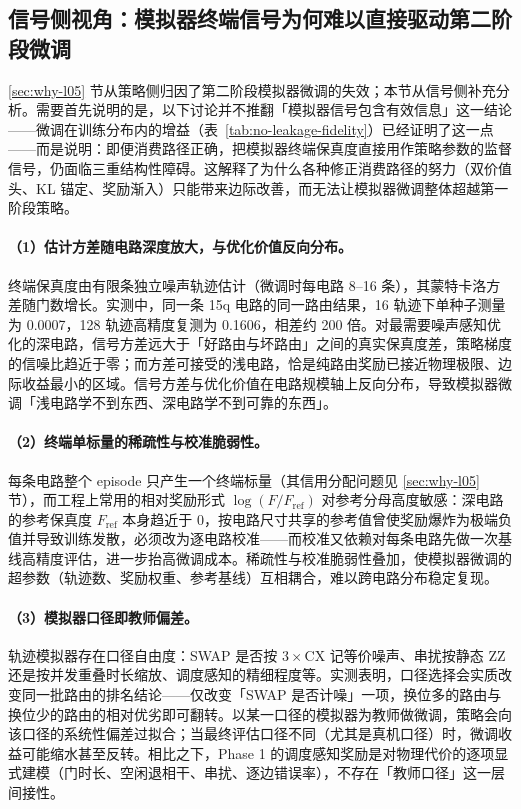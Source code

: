 \subsection{信号侧视角：模拟器终端信号为何难以直接驱动第二阶段微调}
\label{sec:sim-signal-limit}

\ref{sec:why-l05} 节从策略侧归因了第二阶段模拟器微调的失效；本节从信号侧补充分析。需要首先说明的是，以下讨论并不推翻「模拟器信号包含有效信息」这一结论——微调在训练分布内的增益（表~\ref{tab:no-leakage-fidelity}）已经证明了这一点——而是说明：即便消费路径正确，把模拟器终端保真度直接用作策略参数的监督信号，仍面临三重结构性障碍。这解释了为什么各种修正消费路径的努力（双价值头、KL 锚定、奖励渐入）只能带来边际改善，而无法让模拟器微调整体超越第一阶段策略。

\paragraph{（1）估计方差随电路深度放大，与优化价值反向分布。} 终端保真度由有限条独立噪声轨迹估计（微调时每电路 8--16 条），其蒙特卡洛方差随门数增长。实测中，同一条 15q 电路的同一路由结果，16 轨迹下单种子测量为 0.0007，128 轨迹高精度复测为 0.1606，相差约 200 倍。对最需要噪声感知优化的深电路，信号方差远大于「好路由与坏路由」之间的真实保真度差，策略梯度的信噪比趋近于零；而方差可接受的浅电路，恰是纯路由奖励已接近物理极限、边际收益最小的区域。信号方差与优化价值在电路规模轴上反向分布，导致模拟器微调「浅电路学不到东西、深电路学不到可靠的东西」。

\paragraph{（2）终端单标量的稀疏性与校准脆弱性。} 每条电路整个 episode 只产生一个终端标量（其信用分配问题见 \ref{sec:why-l05} 节），而工程上常用的相对奖励形式 $\log(F/F_{\mathrm{ref}})$ 对参考分母高度敏感：深电路的参考保真度 $F_{\mathrm{ref}}$ 本身趋近于 0，按电路尺寸共享的参考值曾使奖励爆炸为极端负值并导致训练发散，必须改为逐电路校准——而校准又依赖对每条电路先做一次基线高精度评估，进一步抬高微调成本。稀疏性与校准脆弱性叠加，使模拟器微调的超参数（轨迹数、奖励权重、参考基线）互相耦合，难以跨电路分布稳定复现。

\paragraph{（3）模拟器口径即教师偏差。} 轨迹模拟器存在口径自由度：SWAP 是否按 $3\times$CX 记等价噪声、串扰按静态 ZZ 还是按并发重叠时长缩放、调度感知的精细程度等。实测表明，口径选择会实质改变同一批路由的排名结论——仅改变「SWAP 是否计噪」一项，换位多的路由与换位少的路由的相对优劣即可翻转。以某一口径的模拟器为教师做微调，策略会向该口径的系统性偏差过拟合；当最终评估口径不同（尤其是真机口径）时，微调收益可能缩水甚至反转。相比之下，Phase 1 的调度感知奖励是对物理代价的逐项显式建模（门时长、空闲退相干、串扰、逐边错误率），不存在「教师口径」这一层间接性。

